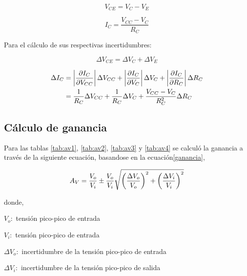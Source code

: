 \documentclass[12pt, a4paper]{article}
\begin{document}
    \begin{equation}
        V_{CE} = V_C - V_E
        \label{Qeq1}
    \end{equation}

    \begin{equation}
        I_C = \frac{V_{CC} - V_C}{R_C}
        \label{Qeq2}
    \end{equation}

    Para el cálculo de sus respectivas incertidumbres:

    \begin{equation}
        \Delta V_{CE} = \Delta V_C + \Delta V_E
        \label{Qeq3}
    \end{equation}

    \begin{equation}
        \begin{split}
            \Delta I_C & = \left | \frac{\partial I_C}{\partial V_{CC}} \right | \Delta V_{CC} + \left | \frac{\partial I_C}{\partial V_C} \right | \Delta V_C + \left | \frac{\partial I_C}{\partial R_C} \right | \Delta R_C \\
            & = {1 \over R_C} \Delta V_{CC} + {1 \over R_C} \Delta V_C + \frac{V_{CC}-V_C}{R_C^2} \Delta R_C
        \end{split}
        \label{Qeq4}
    \end{equation}

    \subsection{Cálculo de ganancia}

    Para las tablas \ref{tab:av1}, \ref{tab:av2}, \ref{tab:av3} y \ref{tab:av4} se calculó la ganancia a través de la siguiente ecuación, basandose en la ecuación\eqref{ganancia},

    \begin{equation} \label{eqAv}
        A_V = {V_o \over V_i} \pm {V_o \over V_i}\sqrt{\left( {\Delta V_o \over V_o} \right)^2 + \left( {\Delta V_i \over V_i} \right)^2}
    \end{equation}

    donde,

    $V_o :$ tensión pico-pico de entrada

    $V_i :$ tensión pico-pico de entrada

    $\Delta V_o :$ incertidumbre de la tensión pico-pico de entrada

    $\Delta V_i :$ incertidumbre de la tensión pico-pico de salida
\end{document}
